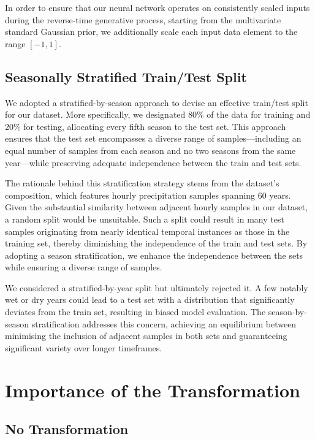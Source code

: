 \documentclass[ oneside,%
                    author={George Herbert},
                    degree={MSci},
                     title={Diffusion Models for Time-Evolving Precipitation Fields},
                  subtitle={}]{dissertation}
\begin{document}
In order to ensure that our neural network operates on consistently scaled inputs during the reverse-time generative process, starting from the multivariate standard Gaussian prior, we additionally scale each input data element to the range $[-1,1]$.

\subsection{Seasonally Stratified Train/Test Split}
\label{sec:results_dataset_train_test}

We adopted a stratified-by-season approach to devise an effective train/test split for our dataset. More specifically, we designated 80\% of the data for training and 20\% for testing, allocating every fifth season to the test set. This approach ensures that the test set encompasses a diverse range of samples---including an equal number of samples from each season and no two seasons from the same year---while preserving adequate independence between the train and test sets.

The rationale behind this stratification strategy stems from the dataset's composition, which features hourly precipitation samples spanning 60 years. Given the substantial similarity between adjacent hourly samples in our dataset, a random split would be unsuitable. Such a split could result in many test samples originating from nearly identical temporal instances as those in the training set, thereby diminishing the independence of the train and test sets. By adopting a season stratification, we enhance the independence between the sets while ensuring a diverse range of samples.

We considered a stratified-by-year split but ultimately rejected it. A few notably wet or dry years could lead to a test set with a distribution that significantly deviates from the train set, resulting in biased model evaluation. The season-by-season stratification addresses this concern, achieving an equilibrium between minimising the inclusion of adjacent samples in both sets and guaranteeing significant variety over longer timeframes.

\section{Importance of the Transformation}
\label{sec:results_importance_of_transformation}

\subsection{No Transformation}
\label{sec:results_no_transformation}
\end{document}
